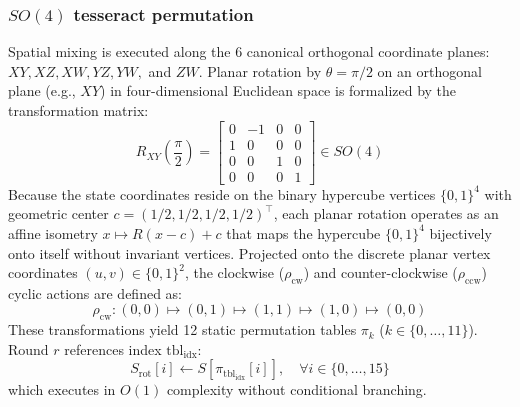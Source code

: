 \documentclass[10pt,twocolumn]{article}
\begin{document}
\subsubsection{\texorpdfstring{$SO(4)$}{SO(4)} tesseract permutation}
Spatial mixing is executed along the 6 canonical orthogonal coordinate planes: $XY, XZ, XW, YZ, YW,$ and $ZW$. Planar rotation by $\theta = \pi/2$ on an orthogonal plane (e.g., $XY$) in four-dimensional Euclidean space is formalized by the transformation matrix:
\begin{equation}
    R_{XY}\left(\frac{\pi}{2}\right) = \begin{bmatrix}
        0 & -1 & 0 & 0 \\
        1 & 0 & 0 & 0 \\
        0 & 0 & 1 & 0 \\
        0 & 0 & 0 & 1
    \end{bmatrix} \in SO(4)
\end{equation}
Because the state coordinates reside on the binary hypercube vertices $\{0, 1\}^4$ with geometric center $c = (1/2, 1/2, 1/2, 1/2)^\top$, each planar rotation operates as an affine isometry $x \mapsto R(x - c) + c$ that maps the hypercube $\{0, 1\}^4$ bijectively onto itself without invariant vertices. Projected onto the discrete planar vertex coordinates $(u, v) \in \{0, 1\}^2$, the clockwise ($\rho_{\text{cw}}$) and counter-clockwise ($\rho_{\text{ccw}}$) cyclic actions are defined as:
\begin{equation}
    \rho_{\text{cw}}: (0,0) \mapsto (0,1) \mapsto (1,1) \mapsto (1,0) \mapsto (0,0)
\end{equation}
These transformations yield 12 static permutation tables $\pi_k$ ($k \in \{0, \dots, 11\}$). Round $r$ references index $\text{tbl}_{\text{idx}}$:
\begin{equation}
    S_{\text{rot}}[i] \leftarrow S[\pi_{\text{tbl}_{\text{idx}}}[i]], \quad \forall i \in \{0, \dots, 15\}
\end{equation}
which executes in $O(1)$ complexity without conditional branching.
\end{document}
